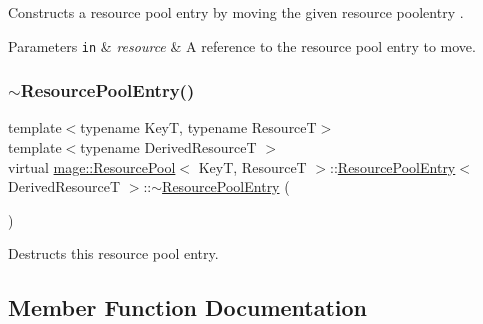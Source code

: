 Constructs a resource pool entry by moving the given resource poolentry .


\begin{DoxyParams}[1]{Parameters}
\mbox{\tt in}  & {\em resource} & A reference to the resource pool entry to move. \\
\hline
\end{DoxyParams}
\hypertarget{structmage_1_1_resource_pool_1_1_resource_pool_entry_ae8d7b54f633fb865e2c299d2fd2bf466}{}\label{structmage_1_1_resource_pool_1_1_resource_pool_entry_ae8d7b54f633fb865e2c299d2fd2bf466} 
\subsubsection{\texorpdfstring{$\sim$\+Resource\+Pool\+Entry()}{~ResourcePoolEntry()}}
{\footnotesize\ttfamily template$<$typename KeyT, typename ResourceT$>$ \\
template$<$typename Derived\+ResourceT $>$ \\
virtual \hyperlink{classmage_1_1_resource_pool}{mage\+::\+Resource\+Pool}$<$ KeyT, ResourceT $>$\+::\hyperlink{structmage_1_1_resource_pool_1_1_resource_pool_entry}{Resource\+Pool\+Entry}$<$ Derived\+ResourceT $>$\+::$\sim$\hyperlink{structmage_1_1_resource_pool_1_1_resource_pool_entry}{Resource\+Pool\+Entry} (\begin{DoxyParamCaption}{ }\end{DoxyParamCaption})\hspace{0.3cm}{\ttfamily [virtual]}}

Destructs this resource pool entry. 

\subsection{Member Function Documentation}
\hypertarget{structmage_1_1_resource_pool_1_1_resource_pool_entry_a2a08bf48f2dce191a23f088530879ca0}{}\label{structmage_1_1_resource_pool_1_1_resource_pool_entry_a2a08bf48f2dce191a23f088530879ca0} 
